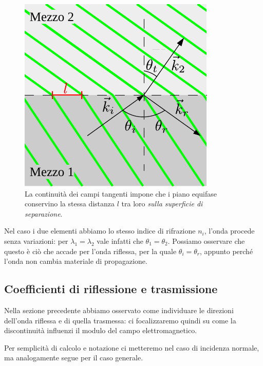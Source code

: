 	\begin{figure}[ht]
		\centering
		\includegraphics{img/incidenza_non_normale.pdf}
		\caption{La continuità dei campi tangenti impone che i piano equifase conservino la stessa distanza $l$ tra loro \emph{sulla superficie di separazione}.}
		\label{fig:incidenza_non_normale_isolanti}
	\end{figure}

	Nel caso i due elementi abbiamo lo stesso indice di rifrazione $n_i$, l'onda procede senza variazioni: per $\lambda_1 = \lambda_2$ vale infatti che $\theta_1 = \theta_2$.
	Possiamo osservare che questo è ciò che accade per l'onda riflessa, per la quale $\theta_i = \theta_r$, appunto perché l'onda non cambia materiale di propagazione.

\subsection{Coefficienti di riflessione e trasmissione}
	Nella sezione precedente abbiamo osservato come individuare le direzioni dell'onda riflessa e di quella trasmessa: ci focalizzaremo quindi su come la discontinuità influenzi il modulo del campo elettromagnetico.

	Per semplicità di calcolo e notazione ci metteremo nel caso di incidenza normale, ma analogamente segue per il caso generale.

